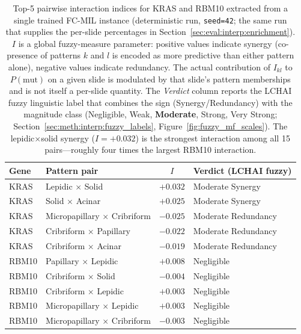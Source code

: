 \begin{table}[ht!]
\centering
\small
\caption[Top-5 pairwise interaction indices for KRAS and
RBM10.]{Top-5 pairwise interaction indices for KRAS and RBM10
extracted from a single trained FC-MIL instance (deterministic run,
\texttt{seed=42}; the same run that supplies the per-slide
percentages in Section~\ref{sec:eval:interp:enrichment}).
$I$ is a global fuzzy-measure parameter: positive values indicate
synergy (co-presence of patterns $k$ and $l$ is encoded as more
predictive than either pattern alone), negative values indicate
redundancy.
The actual contribution of $I_{kl}$ to $P(\text{mut})$ on a given
slide is modulated by that slide's pattern memberships and is not
itself a per-slide quantity.
The \emph{Verdict} column reports the LCHAI fuzzy linguistic label
that combines the sign (Synergy/Redundancy) with the magnitude
class (Negligible, Weak, \textbf{Moderate}, Strong, Very Strong;
Section~\ref{sec:meth:interp:fuzzy_labels},
Figure~\ref{fig:fuzzy_mf_scales}).
The lepidic$\times$solid synergy ($I = +0.032$) is the strongest
interaction among all 15 pairs---roughly four times the largest
RBM10 interaction.}
\label{tab:choquet_interactions}
\begin{tabular}{l l c l}
\hline
\textbf{Gene} & \textbf{Pattern pair} & \textbf{$I$} &
\textbf{Verdict (LCHAI fuzzy)} \\
\hline
KRAS & Lepidic $\times$ Solid              & $+0.032$ & Moderate Synergy \\
KRAS & Solid $\times$ Acinar               & $+0.025$ & Moderate Synergy \\
KRAS & Micropapillary $\times$ Cribriform  & $-0.025$ & Moderate Redundancy \\
KRAS & Cribriform $\times$ Papillary       & $-0.022$ & Moderate Redundancy \\
KRAS & Cribriform $\times$ Acinar          & $-0.019$ & Moderate Redundancy \\
\hline
RBM10 & Papillary $\times$ Lepidic         & $+0.008$ & Negligible \\
RBM10 & Cribriform $\times$ Solid          & $-0.004$ & Negligible \\
RBM10 & Cribriform $\times$ Lepidic        & $+0.003$ & Negligible \\
RBM10 & Micropapillary $\times$ Lepidic    & $+0.003$ & Negligible \\
RBM10 & Micropapillary $\times$ Cribriform & $-0.003$ & Negligible \\
\hline
\end{tabular}
\end{table}

